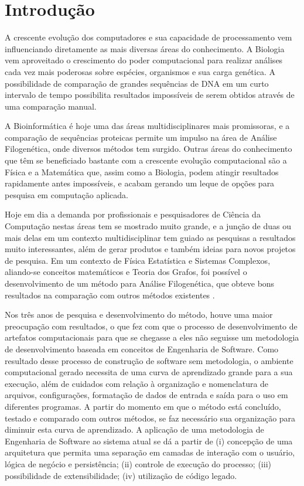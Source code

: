 \chapter{Introdução}

A crescente evolução dos computadores e sua capacidade de processamento vem influenciando diretamente as mais diversas áreas do conhecimento. A Biologia
vem aproveitado o crescimento do poder computacional para realizar análises cada vez mais poderosas sobre espécies, organismos e sua carga genética.
A possibilidade de comparação de grandes sequências de DNA em um curto intervalo de tempo possibilita resultados impossíveis de serem obtidos através
de uma comparação manual.

A Bioinformática é hoje uma das áreas multidisciplinares mais promissoras, e a comparação de sequências proteicas permite um impulso na área de Análise
Filogenética, onde diversos métodos tem surgido. Outras áreas do conhecimento que têm se beneficiado bastante com a crescente evolução computacional são a
Física e a Matemática que, assim como a Biologia, podem atingir resultados rapidamente antes impossíveis, e acabam gerando um leque de opções para pesquisa
em computação aplicada.

Hoje em dia a demanda por profissionais e pesquisadores de Ciência da Computação nestas áreas tem se mostrado muito grande, e a junção de duas ou mais delas
em um contexto multidisciplinar tem guiado as pesquisas a resultados muito interessantes, além de gerar produtos e também ideias para novos projetos de
pesquisa. Em um contexto de Física Estatística e Sistemas Complexos, aliando-se conceitos matemáticos e Teoria dos Grafos, foi possível o
desenvolvimento de um método para Análise Filogenética, que obteve bons resultados na comparação com outros métodos existentes \cite{andrade2011}.

Nos três anos de pesquisa e desenvolvimento do método, houve uma maior preocupação com resultados, o que fez com que o processo de desenvolvimento de
artefatos computacionais  para que se chegasse a eles não seguisse um metodologia de desenvolvimento baseada em conceitos de Engenharia de Software. Como
resultado desse processo de construção de software sem metodologia, o ambiente computacional gerado necessita de
uma curva de aprendizado grande para a sua execução, além de cuidados com relação à organização e nomenclatura de arquivos, configurações,
formatação de dados de entrada e saída para o uso em diferentes programas. A partir do momento em que o método está concluído, testado e comparado com
outros métodos, se faz necessário sua organização para diminuir esta curva de aprendizado. A aplicação de uma metodologia de Engenharia de Software ao
sistema atual se dá a partir de (i) concepção de uma arquitetura que permita uma separação em camadas de interação com o usuário, lógica de negócio e
persistência; (ii) controle de execução do processo; (iii) possibilidade de extensibilidade; (iv) utilização de código legado.

